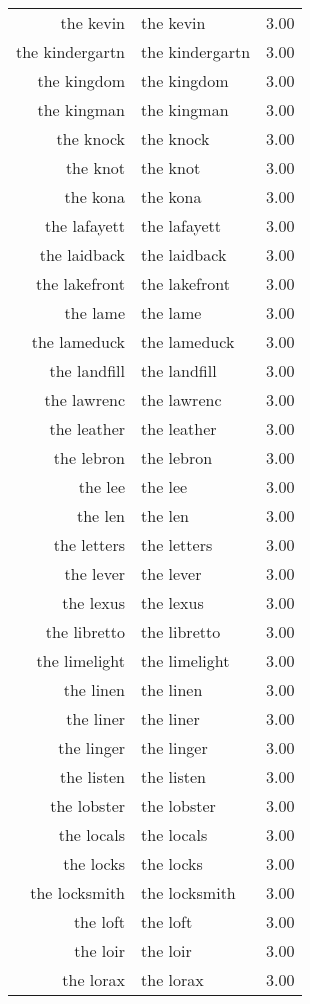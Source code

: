\begin{table}[ht]
\begin{tabular}{rlr}
  the kevin & the kevin & 3.00 \\ 
  the kindergartn & the kindergartn & 3.00 \\ 
  the kingdom & the kingdom & 3.00 \\ 
  the kingman & the kingman & 3.00 \\ 
  the knock & the knock & 3.00 \\ 
  the knot & the knot & 3.00 \\ 
  the kona & the kona & 3.00 \\ 
  the lafayett & the lafayett & 3.00 \\ 
  the laidback & the laidback & 3.00 \\ 
  the lakefront & the lakefront & 3.00 \\ 
  the lame & the lame & 3.00 \\ 
  the lameduck & the lameduck & 3.00 \\ 
  the landfill & the landfill & 3.00 \\ 
  the lawrenc & the lawrenc & 3.00 \\ 
  the leather & the leather & 3.00 \\ 
  the lebron & the lebron & 3.00 \\ 
  the lee & the lee & 3.00 \\ 
  the len & the len & 3.00 \\ 
  the letters & the letters & 3.00 \\ 
  the lever & the lever & 3.00 \\ 
  the lexus & the lexus & 3.00 \\ 
  the libretto & the libretto & 3.00 \\ 
  the limelight & the limelight & 3.00 \\ 
  the linen & the linen & 3.00 \\ 
  the liner & the liner & 3.00 \\ 
  the linger & the linger & 3.00 \\ 
  the listen & the listen & 3.00 \\ 
  the lobster & the lobster & 3.00 \\ 
  the locals & the locals & 3.00 \\ 
  the locks & the locks & 3.00 \\ 
  the locksmith & the locksmith & 3.00 \\ 
  the loft & the loft & 3.00 \\ 
  the loir & the loir & 3.00 \\ 
  the lorax & the lorax & 3.00 \\ 

\end{tabular}
\end{table}
